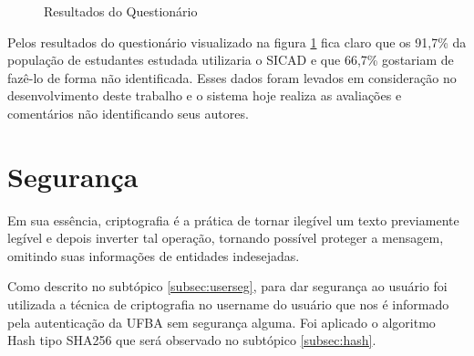 \documentclass[12pt, a4paper]{report}
\begin{document}
\begin{figure}[ht!]
\centering
{}\results
{}
\qquad

\results
{}
\caption{Resultados do Questionário}
\label{fig:questionario}
\end{figure}

Pelos resultados do questionário visualizado na figura \ref{fig:questionario} fica claro que os 91,7\% da população de estudantes estudada utilizaria o SICAD e que 66,7\% gostariam de fazê-lo de forma não identificada. Esses dados foram levados em consideração no desenvolvimento deste trabalho e o sistema hoje realiza as avaliações e comentários não identificando seus autores.

\section{ Segurança}
\label{sec:seguranca}

Em sua essência, criptografia é a prática de tornar ilegível um texto previamente legível e depois inverter tal operação, tornando possível proteger a mensagem, omitindo suas informações de entidades indesejadas. 

Como descrito no subtópico \ref{subsec:userseg}, para dar segurança ao usuário foi utilizada a técnica de criptografia no username do usuário que nos é informado pela autenticação da UFBA sem segurança alguma. Foi aplicado o algoritmo Hash tipo SHA256 que será observado no subtópico \ref{subsec:hash}.
\end{document}

